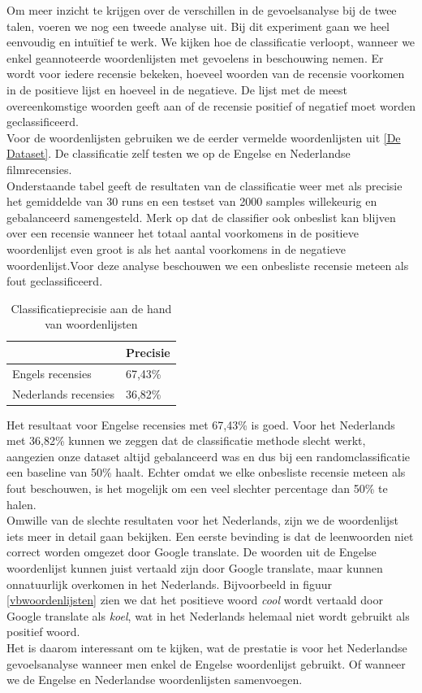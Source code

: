 Om meer inzicht te krijgen over de verschillen in de gevoelsanalyse bij de twee talen, voeren we nog een tweede analyse uit. Bij dit experiment gaan we heel eenvoudig en intu\"itief te werk. We kijken hoe de classificatie verloopt, wanneer we enkel geannoteerde woordenlijsten met gevoelens in beschouwing nemen. Er wordt voor iedere recensie bekeken, hoeveel woorden van de recensie voorkomen in de positieve lijst en hoeveel in de negatieve. De lijst met de meest overeenkomstige woorden geeft aan of de recensie positief of negatief moet worden geclassificeerd.\\
Voor de woordenlijsten gebruiken we de eerder vermelde woordenlijsten uit \ref{De Dataset}. De classificatie zelf testen we op de Engelse en Nederlandse filmrecensies.\\
Onderstaande tabel geeft de resultaten van de classificatie weer met als precisie het gemiddelde van 30 runs en een testset van 2000 samples willekeurig en gebalanceerd samengesteld. Merk op dat de classifier ook onbeslist kan blijven over een recensie wanneer het totaal aantal voorkomens in de positieve woordenlijst even groot is als het aantal voorkomens in de negatieve woordenlijst.Voor deze analyse beschouwen we een onbesliste recensie meteen als fout geclassificeerd.

\begin{table}[h]
\centering
\begin{tabular}{l|l|}
\cline{2-2}
                                           & Precisie \\ \hline
\multicolumn{1}{|l|}{Engels recensies}     & 67,43\%  \\ \hline
\multicolumn{1}{|l|}{Nederlands recensies} & 36,82\%   \\ \hline
\end{tabular}
\caption{Classificatieprecisie aan de hand van woordenlijsten}
\end{table}

 Het resultaat voor Engelse recensies met 67,43\% is goed. Voor het Nederlands met 36,82\% kunnen we zeggen dat de classificatie methode slecht werkt, aangezien onze dataset altijd gebalanceerd was en dus bij een randomclassificatie een baseline van 50\% haalt. Echter omdat we elke onbesliste recensie meteen als fout beschouwen, is het mogelijk om een veel slechter percentage dan 50\% te halen.\\
 Omwille van de slechte resultaten voor het Nederlands, zijn we de woordenlijst iets meer in detail gaan bekijken. Een eerste bevinding is dat de leenwoorden niet correct worden omgezet door Google translate. De woorden uit de Engelse woordenlijst kunnen juist vertaald zijn door Google translate, maar kunnen onnatuurlijk overkomen in het Nederlands. Bijvoorbeeld in figuur \ref{vbwoordenlijsten} zien we dat het positieve woord \textit{cool} wordt vertaald door Google translate als \textit{koel}, wat in het Nederlands helemaal niet wordt gebruikt als positief woord.\\
 Het is daarom interessant om te kijken, wat de prestatie is voor het Nederlandse gevoelsanalyse wanneer men enkel de Engelse woordenlijst gebruikt. Of wanneer we de Engelse en Nederlandse woordenlijsten samenvoegen.

